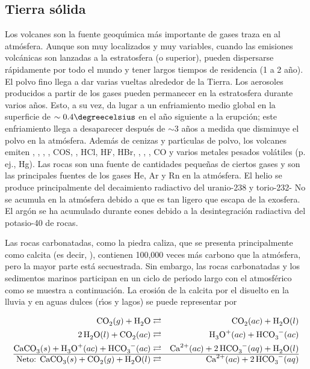 \subsection{Tierra sólida}
Los volcanes son la fuente geoqu\'{\i}mica más importante de gases traza en al atmósfera. Aunque son muy localizados y muy variables, cuando las emisiones volcánicas son lanzadas a la estratosfera (o superior), pueden dispersarse rápidamente por todo el mundo y tener largos tiempos de residencia (1 a 2 año). El polvo fino  llega a dar varias vueltas alrededor de la Tierra. Los aerosoles producidos a partir de los gases pueden permanecer en la estratosfera durante varios años. Esto, a su vez, da lugar a un enfriamiento medio global en la superficie de $\sim0.4\degreecelsius$ en el año siguiente a la erupción; este enfriamiento llega a desaparecer después de $\sim$3 años a medida que disminuye el polvo en la atmósfera. Además de cenizas y part\'{\i}culas de polvo, los volcanes emiten , , , , COS, , HCl, HF, HBr, , , , CO y varios metales pesados volátiles (p. ej., Hg). Las rocas son una fuente de  cantidades pequeñas de ciertos gases y son las principales fuentes de los gases He, Ar y Rn en la atmósfera. El helio se produce principalmente del decaimiento radiactivo del uranio-238 y torio-232- No se acumula en la atmósfera debido a que es tan ligero que escapa de la exosfera. El argón se ha acumulado durante eones debido a la desintegración radiactiva del potasio-40 de rocas.

Las rocas carbonatadas, como la piedra caliza, que se presenta principalmente como calcita (es decir, ), contienen 100,000 veces más carbono que la atmósfera, pero la mayor parte está secuestrada. Sin embargo, las rocas carbonatadas y los sedimentos marinos participan en un ciclo de per\'{\i}odo largo con el  atmosférico como se muestra a continuación. La erosión de la calcita por el  disuelto en la lluvia y en aguas dulces (r\'{\i}os y lagos) se puede representar por

\begin{footnotesize}
\begin{eqnarray}
\ce{CO2}(g) + \ce{H2O} &\rightleftarrows& \ce{CO2}(ac) + \ce{H2O}(l)  \label{eq_co2h2o}\\
\ce{2H2O}(l) +   \ce{CO2}(ac)&\rightleftarrows&   \ce{H3O^+}(ac) +  \ce{HCO3^-}(ac) \label{eq_co2}\\
\ce{CaCO3}(s) +   \ce{H3O^+}(ac) +  \ce{HCO3^-}(ac) &\rightleftarrows& \ce{Ca^{2+}}(ac) + \ce{2HCO3^-}(aq) + \ce{H2O}(l)\label{eq_caco3}\\\hline
\textrm{Neto:       }   \ce{CaCO3}(s) +\ce{CO2}(g) + \ce{H2O}(l)  &\rightleftarrows&\ce{Ca^{2+}}(ac) + \ce{2HCO3^-}(aq)  \label{eq_cca}
\end{eqnarray}
\end{footnotesize}


